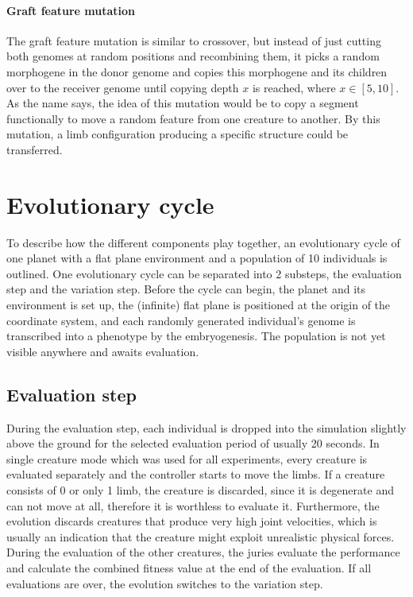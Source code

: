 \documentclass[main]{subfiles}
\begin{document}
\paragraph{Graft feature mutation}

The graft feature mutation is similar to crossover, but instead of just cutting both genomes at random positions and recombining them, it picks a random morphogene in the donor genome and copies this morphogene and its children over to the receiver genome until copying depth $x$ is reached, where $x \in [5,10]$. As the name says, the idea of this mutation would be to copy a segment functionally to move a random feature from one creature to another. By this mutation, a limb configuration producing a specific structure could be transferred.

\section{Evolutionary cycle}

To describe how the different components play together, an evolutionary cycle of one planet with a flat plane environment and a population of 10 individuals is outlined. One evolutionary cycle can be separated into 2 substeps, the evaluation step and the variation step. Before the cycle can begin, the planet and its environment is set up, the (infinite) flat plane is positioned at the origin of the coordinate system, and each randomly generated individual's genome is transcribed into a phenotype by the embryogenesis. The population is not yet visible anywhere and awaits evaluation.

\subsection{Evaluation step}

During the evaluation step, each individual is dropped into the simulation slightly above the ground for the selected evaluation period of usually 20 seconds. In single creature mode which was used for all experiments, every creature is evaluated separately and the controller starts to move the limbs. If a creature consists of 0 or only 1 limb, the creature is discarded, since it is degenerate and can not move at all, therefore it is worthless to evaluate it. Furthermore, the evolution discards creatures that produce very high joint velocities, which is usually an indication that the creature might exploit unrealistic physical forces. During the evaluation of the other creatures, the juries evaluate the performance and calculate the combined fitness value at the end of the evaluation. If all evaluations are over, the evolution switches to the variation step.
\end{document}
